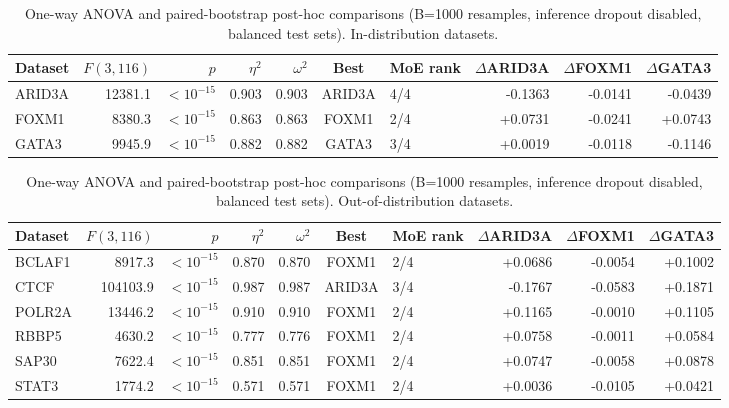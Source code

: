 \begin{table}[ht]
\centering
\caption{One-way ANOVA and paired-bootstrap post-hoc comparisons (B=1000 resamples, inference dropout disabled, balanced test sets). In-distribution datasets.}
\label{tab:optionB_indist}
\begin{tabular}{lrrrrclrrr}
\hline
Dataset & $F(3,116)$ & $p$ & $\eta^2$ & $\omega^2$ & Best & MoE rank & $\Delta$ARID3A & $\Delta$FOXM1 & $\Delta$GATA3 \\
\hline
ARID3A & 12381.1 & $<10^{-15}$ & 0.903 & 0.903 & ARID3A & 4/4 & -0.1363 & -0.0141 & -0.0439 \\
FOXM1 & 8380.3 & $<10^{-15}$ & 0.863 & 0.863 & FOXM1 & 2/4 & +0.0731 & -0.0241 & +0.0743 \\
GATA3 & 9945.9 & $<10^{-15}$ & 0.882 & 0.882 & GATA3 & 3/4 & +0.0019 & -0.0118 & -0.1146 \\
\hline
\end{tabular}
\end{table}

\begin{table}[ht]
\centering
\caption{One-way ANOVA and paired-bootstrap post-hoc comparisons (B=1000 resamples, inference dropout disabled, balanced test sets). Out-of-distribution datasets.}
\label{tab:optionB_ood}
\begin{tabular}{lrrrrclrrr}
\hline
Dataset & $F(3,116)$ & $p$ & $\eta^2$ & $\omega^2$ & Best & MoE rank & $\Delta$ARID3A & $\Delta$FOXM1 & $\Delta$GATA3 \\
\hline
BCLAF1 & 8917.3 & $<10^{-15}$ & 0.870 & 0.870 & FOXM1 & 2/4 & +0.0686 & -0.0054 & +0.1002 \\
CTCF & 104103.9 & $<10^{-15}$ & 0.987 & 0.987 & ARID3A & 3/4 & -0.1767 & -0.0583 & +0.1871 \\
POLR2A & 13446.2 & $<10^{-15}$ & 0.910 & 0.910 & FOXM1 & 2/4 & +0.1165 & -0.0010 & +0.1105 \\
RBBP5 & 4630.2 & $<10^{-15}$ & 0.777 & 0.776 & FOXM1 & 2/4 & +0.0758 & -0.0011 & +0.0584 \\
SAP30 & 7622.4 & $<10^{-15}$ & 0.851 & 0.851 & FOXM1 & 2/4 & +0.0747 & -0.0058 & +0.0878 \\
STAT3 & 1774.2 & $<10^{-15}$ & 0.571 & 0.571 & FOXM1 & 2/4 & +0.0036 & -0.0105 & +0.0421 \\
\hline
\end{tabular}
\end{table}